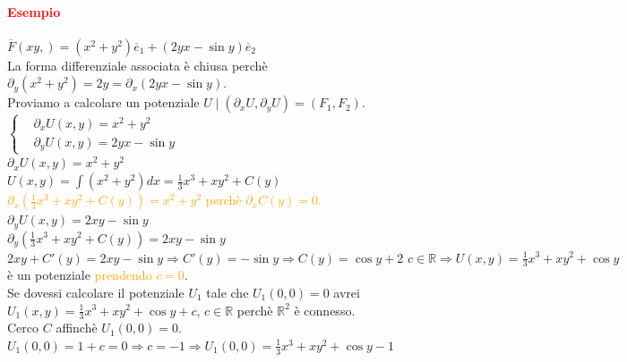 \documentclass{article}
\newcommand{\R}{\mathbb{R}}
\begin{document}
\paragraph{\textcolor{red}{Esempio}}
$\overline{F}(xy,)=(x^2+y^2)\overline{e}_1+(2yx-\sin y)\overline{e}_2$\\
La forma differenziale associata è chiusa perchè $\partial_y(x^2+y^2)=2y=\partial_x(2yx-\sin y)$.\\
Proviamo a calcolare un potenziale $U\mid(\partial_xU,\partial_yU)=(F_1,F_2)$.\\
$\begin{cases}
    &\partial_x U(x,y)=x^2+y^2\\
    &\partial_y U(x,y)=2yx-\sin y
\end{cases}$\\
$\partial_xU(x,y)=x^2+y^2$\\
$U(x,y)= \int (x^2+y^2)dx= \frac{1}{3}x^3+xy^2+C(y)$\\
\textcolor{orange}{$\partial_x\left(\frac{1}{3} x^3+xy^2+C(y)\right)=x^2+y^2$ perchè $\partial_xC(y)=0$.}\\
$\partial_yU(x,y)=2xy-\sin y$\\
$\partial_y \left( \frac{1}{3}x^3+xy^2+C(y) \right)=2xy-\sin y$\\
$2xy+C'(y)=2xy-\sin y \Rightarrow C'(y)=-\sin y \Rightarrow C(y)=\cos y + 2\,\,c \in \R \Rightarrow U(x,y)=\frac{1}{3}x^3+xy^2+\cos y$ è un potenziale \textcolor{orange}{prendendo $c=0$}.\\
Se dovessi calcolare il potenziale $U_1$ tale che $U_1(0,0)=0$ avrei $U_1(x,y)=\frac{1}{3}x^3+xy^2+\cos y +c$, $c \in \R$ perchè $\R^2$ è connesso.\\
Cerco $C$ affinchè $U_1(0,0)=0$.\\
$U_1(0,0)=1+c=0\Rightarrow c=-1\Rightarrow U_1(0,0)=\frac{1}{3}x^3+xy^2+\cos y -1$
\end{document}
